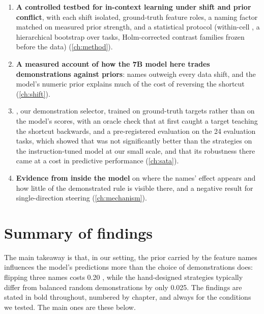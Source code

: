\begin{enumerate}[leftmargin=2em]
  \item \textbf{A controlled testbed for in-context learning under shift and prior conflict}, with each shift isolated, ground-truth feature roles, a naming factor matched on measured prior strength, and a statistical protocol (within-cell \AUROC, a hierarchical bootstrap over tasks, Holm-corrected contrast families frozen before the data) (\autoref{ch:method}).
  \item \textbf{A measured account of how the 7B model here trades demonstrations against priors}: names outweigh every data shift, and the model's numeric prior explains much of the cost of reversing the shortcut (\autoref{ch:shift}).
  
  \item \sata, our demonstration selector, trained on ground-truth targets rather than on the model's scores, with an oracle check that at first caught a target teaching the shortcut backwards, and a pre-registered evaluation on the 24 evaluation tasks, which showed that \sata was not significantly better than the strategies on the instruction-tuned model at our small scale, and that its robustness there came at a cost in predictive performance (\autoref{ch:sata}).

  \item \textbf{Evidence from inside the model} on where the names' effect appears and how little of the demonstrated rule is visible there, and a negative result for single-direction steering (\autoref{ch:mechanism}).
\end{enumerate}

\section{Summary of findings}

The main takeaway is that, in our setting, the prior carried by the feature names influences the model's predictions more than the choice of demonstrations does: flipping three names costs 0.20 \AUROC, while the hand-designed strategies typically differ from balanced random demonstrations by only 0.025.
The findings are stated in bold throughout, numbered by chapter, and always for the conditions we tested.
The main ones are these below.

